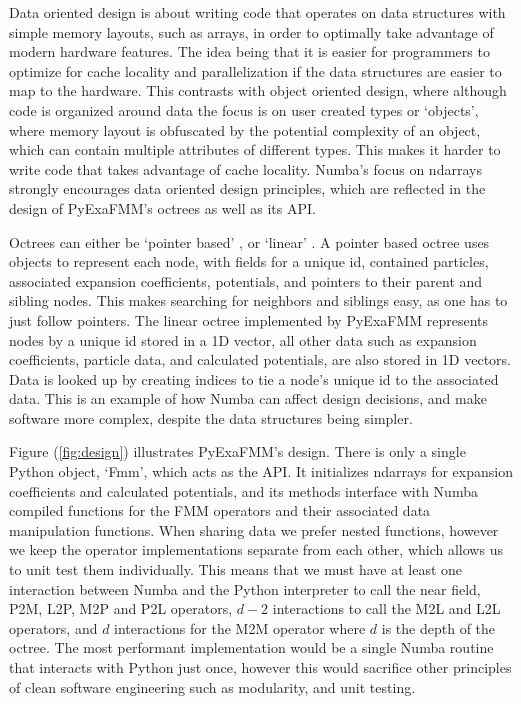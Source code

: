 \documentclass{IEEEcsmag}
\begin{document}
Data oriented design is about writing code that operates on data structures with simple memory layouts, such as arrays, in order to optimally take advantage of modern hardware features. The idea being that it is easier for programmers to optimize for cache locality and parallelization if the data structures are easier to map to the hardware. This contrasts with object oriented design, where although code is organized around data the focus is on user created types or `objects', where memory layout is obfuscated by the potential complexity of an object, which can contain multiple attributes of different types. This makes it harder to write code that takes advantage of cache locality. Numba's focus on ndarrays strongly encourages data oriented design principles, which are reflected in the design of PyExaFMM's octrees as well as its API.

Octrees can either be `pointer based' \cite{Wang2021}, or `linear' \cite{Sundar2007}. A pointer based octree uses objects to represent each node, with fields for a unique id, contained particles, associated expansion coefficients, potentials, and pointers to their parent and sibling nodes. This makes searching for neighbors and siblings easy, as one has to just follow pointers. The linear octree implemented by PyExaFMM represents nodes by a unique id stored in a 1D vector, all other data such as expansion coefficients, particle data, and calculated potentials, are also stored in 1D vectors. Data is looked up by creating indices to tie a node's unique id to the associated data. This is an example of how Numba can affect design decisions, and make software more complex, despite the data structures being simpler.

Figure (\ref{fig:design}) illustrates PyExaFMM's design. There is only a single Python object, `Fmm', which acts as the API. It initializes ndarrays for expansion coefficients and calculated potentials, and its methods interface with Numba compiled functions for the FMM operators and their associated data manipulation functions. When sharing data we prefer nested functions, however we keep the operator implementations separate from each other, which allows us to unit test them individually. This means that we must have at least one interaction between Numba and the Python interpreter to call the near field, P2M, L2P, M2P and P2L operators, $d-2$ interactions to call the  M2L and L2L operators, and $d$ interactions for the M2M operator where $d$ is the depth of the octree. The most performant implementation would be a single Numba routine that interacts with Python just once, however this would sacrifice other principles of clean software engineering such as modularity, and unit testing.
\end{document}
